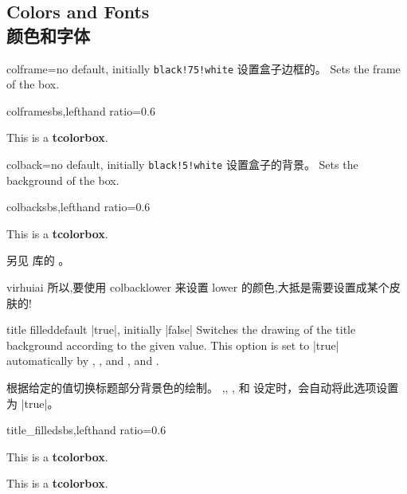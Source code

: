 \setcounter{section}{4}
\setcounter{subsection}{4}
\setcounter{subsubsection}{0}
\subsection{Colors and Fonts\\颜色和字体}

\begin{docTcbKey}{colframe}{=}{no default, initially \texttt{black!75!white}}
设置盒子边框的。\hfill
Sets the frame  of the box.

\begin{exdispExample*}{colframe}{sbs,lefthand ratio=0.6}
\begin{tcolorbox}[colframe=red!50!white]
This is a \textbf{tcolorbox}.
\end{tcolorbox}
\end{exdispExample*}
\end{docTcbKey}

\begin{docTcbKey}{colback}{=}{no default, initially \texttt{black!5!white}}
设置盒子的背景。\hfill
Sets the background  of the box.
\begin{exdispExample*}{colback}{sbs,lefthand ratio=0.6}
\begin{tcolorbox}[colback=red!50!white]
This is a \textbf{tcolorbox}.
\end{tcolorbox}
\end{exdispExample*}
\end{docTcbKey}

另见  库的 。
\begin{引述之言}{virhuiai}
所以,要使用 colbacklower 来设置 lower 的颜色,大抵是需要设置成某个皮肤的!
\end{引述之言}
    

\begin{docTcbKey}{title filled}{}{default |true|, initially |false|}
Switches the drawing of the title background according to the given value.
This option is set to |true| automatically by ,
, and ,
and .

根据给定的值切换标题部分背景色的绘制。
,, ,
和  设定时，会自动将此选项设置为 |true|。

\begin{exdispExample*}{title_filled}{sbs,lefthand ratio=0.6}
\begin{tcolorbox}[title=My title,title filled]
This is a \textbf{tcolorbox}.
\end{tcolorbox}
\begin{tcolorbox}[title=My title,
title filled=false]
This is a \textbf{tcolorbox}.
\end{tcolorbox}
\end{exdispExample*}
\end{docTcbKey}


